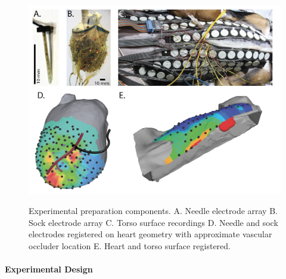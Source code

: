  \begin{figure}[htb]
	\begin{center}
		{\includegraphics[width=1\textwidth]
			{../Figures/fig1.png}}
		\captionsetup{width = 1\textwidth}
		\caption{\small \label{fig:prep} Experimental preparation
			components. A. Needle electrode array B. Sock electrode array
			C. Torso surface recordings D. Needle and sock electrodes
			registered on heart geometry with approximate vascular occluder
			location E. Heart and torso surface registered.}
	\end{center}
 \end{figure}

\paragraph{Experimental Design}

